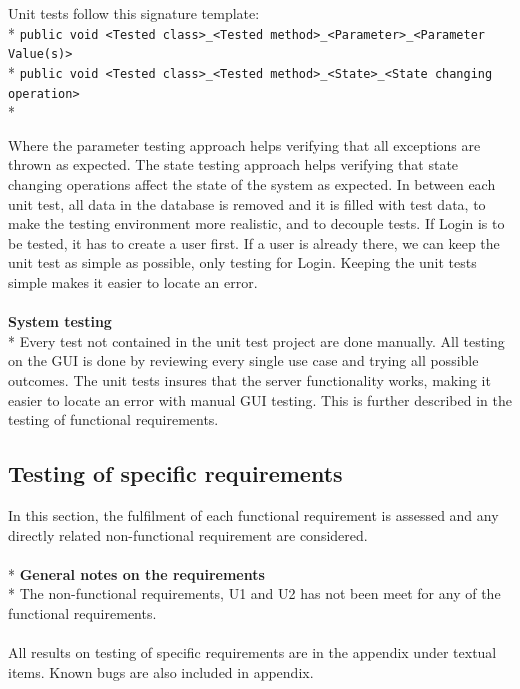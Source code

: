 \documentclass[a4paper,11pt,report]{article}
\begin{document}
Unit tests follow this signature template:
\\*
\verb|public void <Tested class>_<Tested method>_<Parameter>_<Parameter Value(s)>|
\\*
\verb|public void <Tested class>_<Tested method>_<State>_<State changing operation>|
\\*

Where the parameter testing approach helps verifying that all exceptions are thrown as expected. The state testing approach helps verifying that state changing operations affect the state of the system as expected. In between each unit test, all data in the database is removed and it is filled with test data, to make the testing environment more realistic, and to decouple tests. If Login is to be tested, it has to create a user first. If a user is already there, we can keep the unit test as simple as possible, only testing for Login. Keeping the unit tests simple makes it easier to locate an error. \\ \\
\textbf{System testing}\\*
Every test not contained in the unit test project are done manually. All testing on the GUI is done by reviewing every single use case and trying all possible outcomes. The unit tests insures that the server functionality works, making it easier to locate an error with manual GUI testing. This is further described in the testing of functional requirements.


\subsection{Testing of specific requirements}
In this section, the fulfilment of each functional requirement is assessed and any directly related non-functional requirement are considered. \\ \\*
\textbf{General notes on the requirements} \\*
The non-functional requirements, U1 and U2 has not been meet for any of the functional requirements. \\ \\
All results on testing of specific requirements are in the appendix under textual items. Known bugs are also included in appendix.
\end{document}
